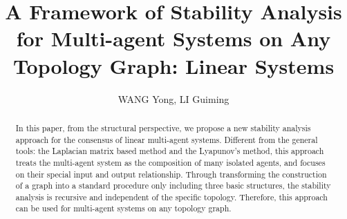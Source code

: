 \documentclass[english]{cccconf}
\begin{document}
\title{A Framework of Stability Analysis for Multi-agent Systems on Any Topology Graph: Linear Systems}
\author{WANG Yong, LI Guiming}








\maketitle

\begin{abstract}
In this paper, from the structural perspective, we propose a new stability analysis approach for the consensus of linear multi-agent systems. Different from the general tools: the Laplacian matrix based method and the Lyapunov's method, this  approach  treats the multi-agent system as the composition of many isolated agents, and focuses on their special  input and output relationship.  Through transforming the construction of a graph into a standard procedure only including three basic structures, the stability analysis is recursive and   independent of the specific topology. Therefore, this approach can be used for multi-agent systems on  any topology graph.
\end{abstract}


\end{document}

